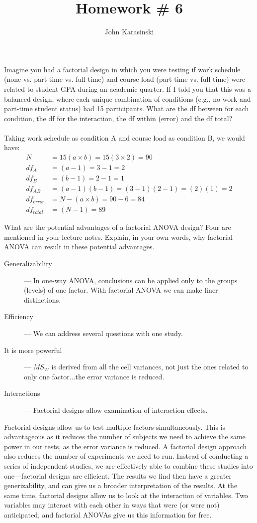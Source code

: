\documentclass[onecolumn,10pt]{jhwhw}
\author{John Karasinski}
\title{Homework \# 6}
\begin{document}

\problem{}
Imagine you had a factorial design in which you were testing if work schedule (none vs. part-time vs. full-time) and course load (part-time vs. full-time) were related to student GPA during an academic quarter. If I told you that this was a balanced design, where each unique combination of conditions (e.g., no work and part-time student status) had 15 participants. What are the df between for each condition, the df for the interaction, the df within (error) and the df total?\\
\\
Taking work schedule as condition A and course load as condition B, we would have:
\begin{align*}
N &= 15 (a \times b) = 15 (3 \times 2) = 90\\
df_A &= (a - 1) = 3 - 1 = 2\\
df_B &= (b - 1) = 2 - 1 = 1\\
df_{AB} &= (a-1)(b-1) = (3-1)(2-1) = (2)(1) = 2\\
df_{error} &= N - (a \times b) = 90 - 6 = 84\\
df_{total} &= (N - 1) = 89
\end{align*}


\problem{}
What are the potential advantages of a factorial ANOVA design? Four are mentioned in your lecture notes. Explain, in your own words, why factorial ANOVA can result in these potential advantages.

\begin{description}
\item[Generalizability] --- In one-way ANOVA, conclusions can be applied only to the groups (levels) of one factor. With factorial ANOVA we can make finer distinctions.
\item[Efficiency] --- We can address several questions with one study.
\item[It is more powerful] --- $MS_W$ is derived from all the cell variances, not just the ones related to only one factor...the error variance is reduced.
\item[Interactions] --- Factorial designs allow examination of interaction effects.
\end{description}

Factorial designs allow us to test multiple factors simultaneously. This is advantageous as it reduces the number of subjects we need to achieve the same power in our tests, as the error variance is reduced. A factorial design approach also reduces the number of experiments we need to run. Instead of conducting a series of independent studies, we are effectively able to combine these studies into one---factorial designs are efficient. The results we find then have a greater generizability, and can give us a broader interpretation of the results. At the same time, factorial designs allow us to look at the interaction of variables. Two variables may interact with each other in ways that were (or were not) anticipated, and factorial ANOVAs give us this information for free.
\end{document}
